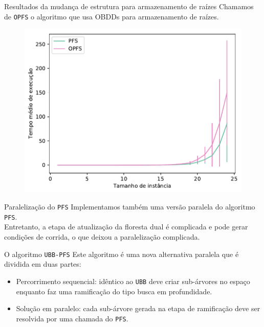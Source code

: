 \documentclass{beamer}
\newcommand{\algname}[1]{\texttt{#1}}
\begin{document}
\begin{frame}{Resultados da mudança de estrutura para armazenamento de raízes}
Chamamos de \algname{OPFS} o algoritmo que usa OBDDs para armazenamento
de raízes.
\pause
\begin{figure}[ht]
\includegraphics[clip=true, width=.7\textwidth]{pfs/opfs_avg_time.pdf}
\end{figure}
\end{frame}


\begin{frame}{Paralelização do \algname{PFS}}
Implementamos também uma versão paralela do algoritmo \algname{PFS}.
\vspace{1em}
\pause\\

Entretanto, a etapa de atualização da floresta dual é complicada e pode 
gerar condições de corrida, o que deixou a paralelização complicada.
\end{frame}

\begin{frame}{O algoritmo \algname{UBB-PFS}}
Este algoritmo é uma nova alternativa paralela que é dividida em duas
partes:
\vspace{1em}
\pause\\
\begin{itemize}
  \item{Percorrimento sequencial: idêntico ao \algname{UBB} deve criar
    sub-árvores no espaço enquanto faz uma ramificação do tipo
    busca em profundidade.}
  \pause
  \item{Solução em paralelo: cada sub-árvore gerada na etapa de 
    ramificação deve ser resolvida por uma chamada do \algname{PFS}.}
\end{itemize}
\end{frame}
\end{document}
